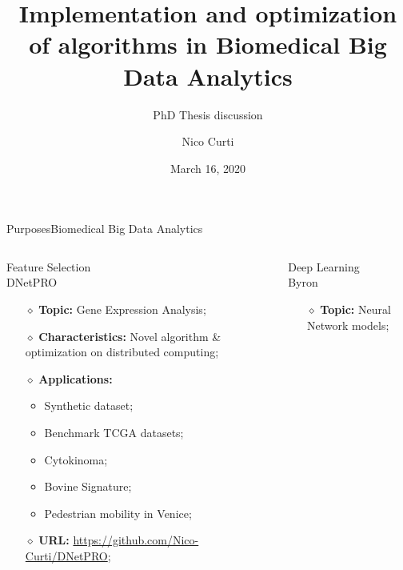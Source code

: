 \documentclass[10pt, technote, oribibl, unicode]{beamer}
\title{Implementation and optimization of algorithms in Biomedical Big Data Analytics}
\subtitle{PhD Thesis discussion}
\date[March 16, 2020]{March 16, 2020}
\author[Nico Curti]{Nico Curti}
\begin{document}
\begin{frame}

  \titlepage

\end{frame}


\begin{frame}{Purposes}{Biomedical Big Data Analytics}

  \begin{columns}

    \begin{column}{0.5\textwidth}

      \begin{exampleblock}{Feature Selection\\DNetPRO}
        \begin{itemize}
          \item[$\diamond$] \textbf{Topic:} Gene Expression Analysis;

          \item[$\diamond$] \textbf{Characteristics:} Novel algorithm \& optimization on distributed computing;

          \item[$\diamond$] \textbf{Applications:}
            \begin{itemize}
              \item Synthetic dataset;
              \item Benchmark TCGA datasets;
              \item Cytokinoma;
              \item Bovine Signature;
              \item Pedestrian mobility in Venice;
            \end{itemize}

          \item[$\diamond$] \textbf{URL:} \url{https://github.com/Nico-Curti/DNetPRO};
        \end{itemize}
      \end{exampleblock}

    \end{column}
    \begin{column}{0.5\textwidth}

      \begin{block}{Deep Learning\\Byron}
        \begin{itemize}
          \item[$\diamond$] \textbf{Topic:} Neural Network models;


\end{itemize}
\end{block}
\end{column}
\end{columns}
\end{frame}
\end{document}
